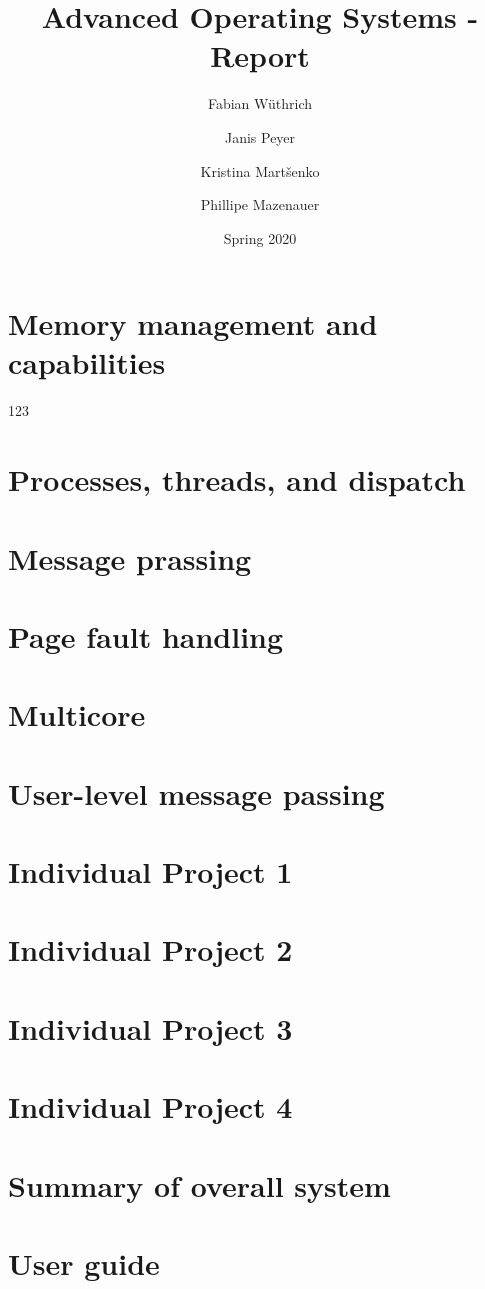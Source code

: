 \documentclass[11pt,a4paper]{report}
\begin{document}
\title{Advanced Operating Systems - Report}
\author{
Fabian Wüthrich
\and
Janis Peyer 
\and
Kristina Martšenko
\and
Phillipe Mazenauer
}
\date{Spring 2020}

\maketitle

\tableofcontents

\listoffigures

\listoftables

\clearpage

\chapter{Memory management and capabilities}

123 \cite{aos-book}

\chapter{Processes, threads, and dispatch}

\chapter{Message prassing}

\chapter{Page fault handling}

\chapter{Multicore}

\chapter{User-level message passing}

\chapter{Individual Project 1}

\chapter{Individual Project 2}

\chapter{Individual Project 3}

\chapter{Individual Project 4}

\chapter{Summary of overall system}

\appendix

\chapter{User guide}

\printbibliography
\end{document}
